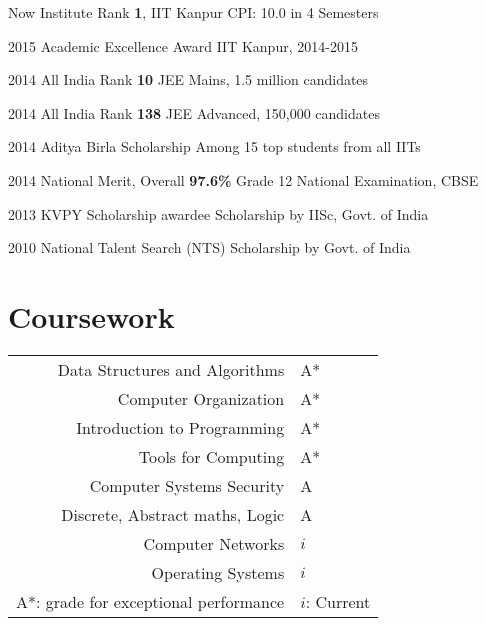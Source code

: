 \documentclass{tccv}
\begin{document}
\begin{yearlist}

\item{\small{Now}}
  {Institute Rank \textbf{1}, IIT Kanpur}
  {\small{CPI: 10.0 in 4 Semesters}}

\item{\small{2015}}
  {Academic Excellence Award}
  {\small{IIT Kanpur, 2014-2015}}

\item{\small{2014}}
  {All India Rank \textbf{10}}
  {\small{JEE Mains, 1.5 million candidates}}

\item {\small{2014}}
  {All India Rank \textbf{138}}
  {\small{JEE Advanced, 150,000 candidates}}

\item {\small{2014}}
  {Aditya Birla Scholarship}
  {\small{Among 15 top students from all IITs}}

\item {\small{2014}}
  {National Merit, Overall \textbf{97.6\%}}
  {\small{Grade 12 National Examination, CBSE}}

\item {\small{2013}}
  {KVPY Scholarship awardee}
  {\small{Scholarship by IISc, Govt. of India}}

\item {\small{2010}}
  {National Talent Search (NTS)}
  {\small{Scholarship by Govt. of India}}

\end{yearlist}

\vspace{-0.6cm}
\section{Coursework}
\begin{tabularx}{\linewidth}{ r l }
  Data Structures and Algorithms & A*\\
  Computer Organization & A*\\
  Introduction to Programming & A*\\
  Tools for Computing & A*\\
  Computer Systems Security & A\\
  Discrete, Abstract maths, Logic & A\\
  Computer Networks & $i$\\
  Operating Systems & $i$\\
  \footnotesize{A*: grade for exceptional
    performance}&\footnotesize{$i$: Current}\\
\end{tabularx}
\end{document}
